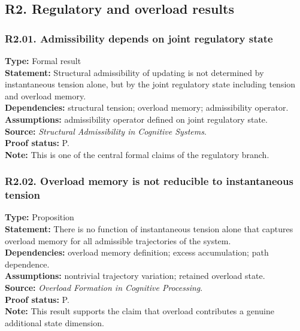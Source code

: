 \documentclass[12pt]{article}
\begin{document}
	\subsection{R2. Regulatory and overload results}
	
	\subsubsection*{R2.01. Admissibility depends on joint regulatory state}
	\textbf{Type:} Formal result \\
	\textbf{Statement:} Structural admissibility of updating is not determined by instantaneous
	tension alone, but by the joint regulatory state including tension and overload memory. \\
	\textbf{Dependencies:} structural tension; overload memory; admissibility operator. \\
	\textbf{Assumptions:} admissibility operator defined on joint regulatory state. \\
	\textbf{Source:} \emph{Structural Admissibility in Cognitive Systems}. \\
	\textbf{Proof status:} P. \\
	\textbf{Note:} This is one of the central formal claims of the regulatory branch.
	
	\subsubsection*{R2.02. Overload memory is not reducible to instantaneous tension}
	\textbf{Type:} Proposition \\
	\textbf{Statement:} There is no function of instantaneous tension alone that captures overload
	memory for all admissible trajectories of the system. \\
	\textbf{Dependencies:} overload memory definition; excess accumulation; path dependence. \\
	\textbf{Assumptions:} nontrivial trajectory variation; retained overload state. \\
	\textbf{Source:} \emph{Overload Formation in Cognitive Processing}. \\
	\textbf{Proof status:} P. \\
	\textbf{Note:} This result supports the claim that overload contributes a genuine additional
	state dimension.
	
\end{document}
